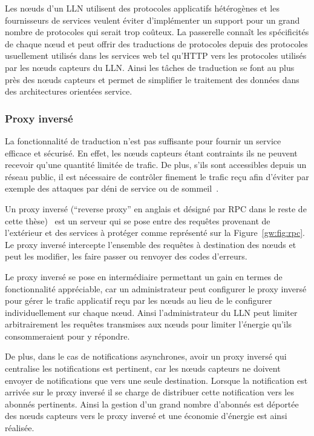 Les nœuds d'un \ac{LLN} utilisent des protocoles applicatifs hétérogènes et les fournisseurs de services veulent éviter d'implémenter un support pour un grand nombre de protocoles qui serait trop coûteux.
La passerelle connaît les spécificités de chaque nœud et peut offrir des traductions de protocoles depuis des protocoles usuellement utilisés dans les services web tel qu'\ac{HTTP} vers les protocoles utilisés par les nœuds capteurs du \ac{LLN}.
Ainsi les tâches de traduction se font au plus près des nœuds capteurs et permet de simplifier le traitement des données dans des architectures orientées service.

\subsubsection{Proxy inversé}
\label{gw:reverse_proxy}

La fonctionnalité de traduction n'est pas suffisante pour fournir un service efficace et sécurisé.
En effet, les nœuds capteurs étant contraints ils ne peuvent recevoir qu'une quantité limitée de trafic.
De plus, s'ils sont accessibles depuis un réseau public, il est nécessaire de contrôler finement le trafic reçu afin d'éviter par exemple des attaques par déni de service ou de sommeil~\cite{wessels2001web,raymond2008denial}.

Un proxy inversé (``reverse proxy'' en anglais et désigné par \ac{RPC} dans le reste de cette thèse)~\cite{reese2008nginx} est un serveur qui se pose entre des requêtes provenant de l'extérieur et des services à protéger comme représenté sur la Figure~\ref{gw:fig:rpc}.
Le proxy inversé intercepte l'ensemble des requêtes à destination des nœuds et peut les modifier, les faire passer ou renvoyer des codes d'erreurs.

Le proxy inversé se pose en intermédiaire permettant un gain en termes de fonctionnalité  appréciable, car un administrateur peut configurer le proxy inversé pour gérer le trafic applicatif reçu par les nœuds au lieu de le configurer individuellement sur chaque nœud.
Ainsi l'administrateur du \ac{LLN} peut limiter arbitrairement les requêtes transmises aux nœuds pour limiter l'énergie qu'ils consommeraient pour y répondre.

De plus, dans le cas de notifications asynchrones, avoir un proxy inversé qui centralise les notifications est pertinent, car les nœuds capteurs ne doivent envoyer de notifications que vers une seule destination.
Lorsque la notification est arrivée sur le proxy inversé il se charge de distribuer cette notification vers les abonnés pertinents.
Ainsi la gestion d'un grand nombre d'abonnés est déportée des nœuds capteurs vers le proxy inversé et une économie d'énergie est ainsi réalisée.

